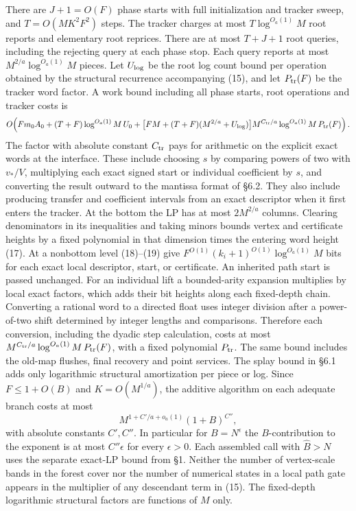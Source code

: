 \documentclass[11pt]{article}
\begin{document}
There are \(J+1=O(F)\) phase starts with full initialization and tracker sweep, and \(T=O(MK^2 F^2)\) steps. The tracker charges at most \(T\log^{O_a(1)}M\) root reports and elementary root reprices. There are at most \(T+J+1\) root queries, including the rejecting query at each phase stop. Each query reports at most \(M^{2/a}\log^{O_a(1)}M\) pieces. Let \(U_{\rm log}\) be the root log count bound per operation obtained by the structural recurrence accompanying (15), and let \(P_{\rm tr}(F)\) be the tracker word factor. A work bound including all phase starts, root operations and tracker costs is
\[
 O\!\left(Fm_0 A_0+(T+F)\log^{O_a(1)}M\,U_0+
 \big[FM+(T+F)(M^{2/a}+U_{\rm log})\big]M^{C_{\rm tr}/a}\log^{O_a(1)}M\,P_{\rm tr}(F)\right).
\]
The factor with absolute constant \(C_{\rm tr}\) pays for arithmetic on the explicit exact words at the interface. These include choosing \(s\) by comparing powers of two with \(v_\ast/V\), multiplying each exact signed start or individual coefficient by \(s\), and converting the result outward to the mantissa format of §6.2. They also include producing transfer and coefficient intervals from an exact descriptor when it first enters the tracker. At the bottom the LP has at most \(2M^{2/a}\) columns. Clearing denominators in its inequalities and taking minors bounds vertex and certificate heights by a fixed polynomial in that dimension times the entering word height (17). At a nonbottom level (18)--(19) give \(F^{O(1)}(k_i+1)^{O(1)}\log^{O_a(1)}M\) bits for each exact local descriptor, start, or certificate. An inherited path start is passed unchanged. For an individual lift a bounded-arity expansion multiplies by local exact factors, which adds their bit heights along each fixed-depth chain. Converting a rational word to a directed float uses integer division after a power-of-two shift determined by integer lengths and comparisons. Therefore each conversion, including the dyadic step calculation, costs at most \(M^{C_{\rm tr}/a}\log^{O_a(1)}M\,P_{\rm tr}(F)\), with a fixed polynomial \(P_{\rm tr}\). The same bound includes the old-map flushes, final recovery and point services. The splay bound in §6.1 adds only logarithmic structural amortization per piece or log. Since \(F\le1+O(B)\) and \(K=O(M^{1/a})\), the additive algorithm on each adequate branch costs at most
\[
       M^{1+C'/a+o_a(1)}(1+B)^{C''},
\tag{16}
\]
with absolute constants \(C',C''\). In particular for \(B=N^\epsilon\) the \(B\)-contribution to the exponent is at most \(C''\epsilon\) for every \(\epsilon>0\). Each assembled call with \(\widehat B>N\) uses the separate exact-LP bound from §1. Neither the number of vertex-scale bands in the forest cover nor the number of numerical states in a local path gate appears in the multiplier of any descendant term in (15). The fixed-depth logarithmic structural factors are functions of \(M\) only.
\end{document}
